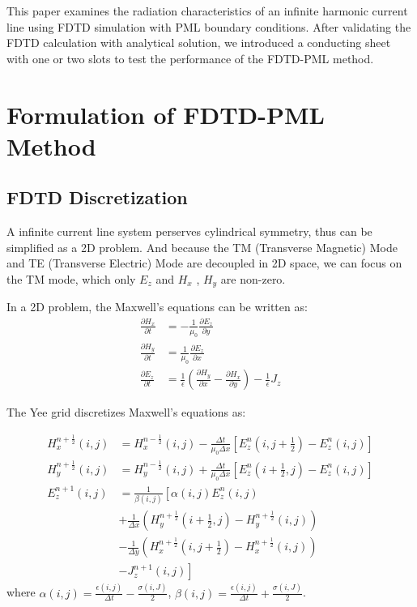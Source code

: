 \documentclass[journal]{IEEEtran}
\begin{document}
This paper examines the radiation characteristics of an infinite harmonic current line using FDTD simulation with PML boundary conditions. 
After validating the FDTD calculation with analytical solution, we introduced a conducting sheet with one or two slots to test the performance of the FDTD-PML method.

\section{Formulation of FDTD-PML Method}
\subsection{FDTD Discretization}
A infinite current line system perserves cylindrical symmetry, thus can be simplified as a 2D problem.
And because the TM (Transverse Magnetic) Mode and TE (Transverse Electric) Mode are decoupled in 2D space, we can focus on the TM mode, 
which only $E_z$ and $H_x$ , $H_y$ are non-zero. 

In a 2D problem, the Maxwell's equations can be written as:
\begin{align}
\frac{\partial H_x}{\partial t} &= -\frac{1}{\mu_0}\frac{\partial E_z}{\partial y} \\
\frac{\partial H_y}{\partial t} &= \frac{1}{\mu_0}\frac{\partial E_z}{\partial x} \\
\frac{\partial E_z}{\partial t} &= \frac{1}{\epsilon}\left(\frac{\partial H_y}{\partial x} - \frac{\partial H_x}{\partial y}\right) - \frac{1}{\epsilon} J_z
\end{align}

The Yee grid discretizes Maxwell's equations as:

\begin{align}
H_x^{n+\frac{1}{2}}(i,j) &= H_x^{n-\frac{1}{2}}(i,j) - \frac{\Delta t}{\mu_0\Delta x}\left[E_z^n(i,j+\frac{1}{2}) - E_z^n(i,j)\right] \\
H_y^{n+\frac{1}{2}}(i,j) &= H_y^{n-\frac{1}{2}}(i,j) + \frac{\Delta t}{\mu_0\Delta x}\left[E_z^n(i+\frac{1}{2},j) - E_z^n(i,j)\right] \\  
E_z^{n+1}(i,j) &= \frac{1}{\beta(i,j)}\left[\alpha(i,j) E_z^n(i,j) \right. \nonumber \\
&+ \frac{1}{\Delta x}\left(H_y^{n+\frac{1}{2}}(i+\frac{1}{2},j) - H_y^{n+\frac{1}{2}}(i,j)\right) \nonumber \\
&- \frac{1}{\Delta y}\left(H_x^{n+\frac{1}{2}}(i,j+\frac{1}{2}) - H_x^{n+\frac{1}{2}}(i,j)\right) \nonumber \\
&\left. - J_z^{n+1}(i,j)\right]
\end{align}
where $\alpha(i,j)=\frac{\epsilon(i,j)}{\Delta t}-\frac{\sigma(i,J)}{2}$, $\beta(i,j)=\frac{\epsilon(i,j)}{\Delta t}+\frac{\sigma(i,J)}{2}$.
\end{document}
